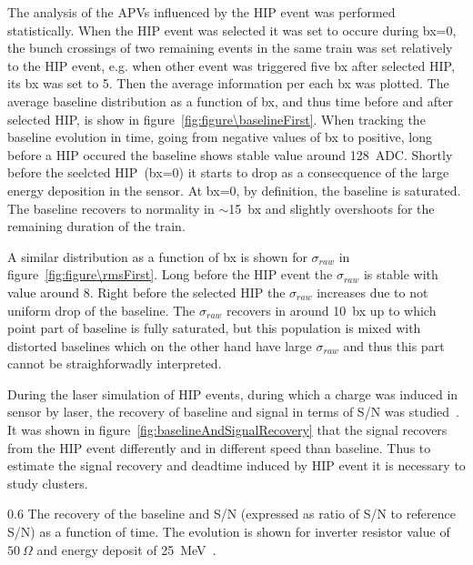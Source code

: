 The analysis of the APVs influenced by the HIP event was performed statistically. When the HIP event was selected it was set to occure during bx=0, the bunch crossings of two remaining events in the same train was set relatively to the HIP event, e.g. when other event was triggered five bx after selected HIP, its bx was set to 5. Then the average information per each bx was plotted. The average baseline distribution as a function of bx, and thus time before and after selected HIP, is show in figure~\ref{fig:figure\baselineFirst}. When tracking the baseline evolution in time, going from negative values of bx to positive, long before a HIP occured the baseline shows stable value around 128~ADC. Shortly before the seelcted HIP~(bx=0) it starts to drop as a consecquence of the large energy deposition in the sensor. At bx=0, by definition, the baseline is saturated. The baseline recovers to normality in $\sim$15~bx and slightly overshoots for the remaining duration of the train.

A similar distribution as a function of bx is shown for $\sigma_{raw}$ in figure~\ref{fig:figure\rmsFirst}. Long before the HIP event the $\sigma_{raw}$ is stable with value around 8. Right before the selected HIP the $\sigma_{raw}$ increases due to not uniform drop of the baseline. The $\sigma_{raw}$ recovers in around 10~bx up to which point part of baseline is fully saturated, but this population is mixed with distorted baselines which on the other hand have large $\sigma_{raw}$ and thus this part cannot be straighforwadly interpreted.




During the laser simulation of HIP events, during which a charge was induced in sensor by laser, the recovery of baseline and signal in terms of S/N was studied~\cite{Adam:2005pz}. It was shown in figure~\ref{fig:baselineAndSignalRecovery} that the signal recovers from the HIP event differently and in different speed than baseline. Thus to estimate the signal recovery and deadtime induced by HIP event it is necessary to study clusters.

                 {0.6}       %
                 {The recovery of the baseline and S/N (expressed as ratio of S/N to reference S/N) as a function of time. The evolution is shown for inverter resistor value of $50~\Omega$ and energy deposit of 25~MeV~\cite{Adam:2005pz}.} %

